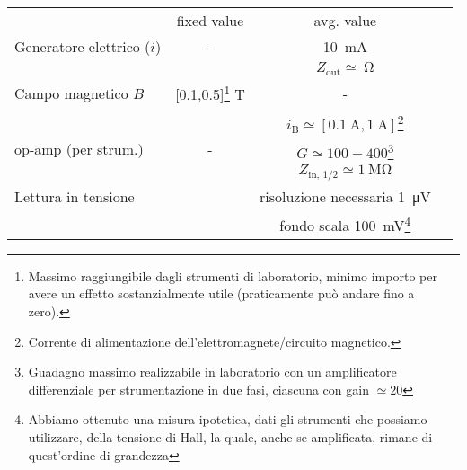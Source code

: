     \begin{tabular}{lccc}
        \toprule
        & fixed value & avg. value \\
        \colrule
        Generatore elettrico ($i$) & - & \SI{10}{\milli\ampere} \\
        & & $Z_\text{out}\simeq\SI{}{\ohm}$ \\
        Campo magnetico $B$ & [0.1,0.5]\footnote{Massimo raggiungibile dagli strumenti di laboratorio, minimo importo per avere un effetto sostanzialmente utile (praticamente può andare fino a zero).} \si{\tesla} & - \\
        && $i_\text{B}\simeq[\SI{0.1}{\ampere}, \SI{1}{\ampere}]$\footnote{Corrente di alimentazione dell'elettromagnete/circuito magnetico.} \\
        op-amp (per strum.) & - & $G\simeq 100-400$\footnote{Guadagno massimo realizzabile in laboratorio con un amplificatore differenziale per strumentazione in due fasi, ciascuna con gain $\simeq20$} \\
        && $Z_\text{in, 1/2}\simeq\SI{1}{\mega\ohm}$ \\
        Lettura in tensione & & risoluzione necessaria \SI{1}{\micro\volt} \\
        && fondo scala \SI{100}{\milli\volt}\footnote{Abbiamo ottenuto una misura ipotetica, dati gli strumenti che possiamo utilizzare, della tensione di Hall, la quale, anche se amplificata, rimane di quest'ordine di grandezza} \\
        \toprule
    \end{tabular}
